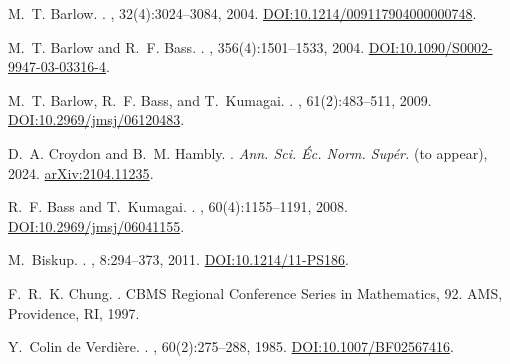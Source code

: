 \documentclass[11pt]{article}
\numberwithin{equation}{section}
\begin{document}

\begin{thebibliography}{99}

M.~T. Barlow.
.
, 32(4):3024--3084, 2004.
\newblock \href{https://doi.org/10.1214/009117904000000748}{DOI:10.1214/009117904000000748}.

M.~T. Barlow and R.~F. Bass.
.
, 356(4):1501--1533, 2004.
\newblock \href{https://doi.org/10.1090/S0002-9947-03-03316-4}{DOI:10.1090/S0002-9947-03-03316-4}.

M.~T. Barlow, R.~F. Bass, and T.~Kumagai.
.
, 61(2):483--511, 2009.
\newblock \href{https://doi.org/10.2969/jmsj/06120483}{DOI:10.2969/jmsj/06120483}.

D.~A. Croydon and B.~M. Hambly.
.
\newblock \emph{Ann. Sci. Éc. Norm. Supér.} (to appear), 2024.
\newblock \href{https://arxiv.org/abs/2104.11235}{arXiv:2104.11235}.

R.~F. Bass and T.~Kumagai.
.
, 60(4):1155--1191, 2008.
\newblock \href{https://doi.org/10.2969/jmsj/06041155}{DOI:10.2969/jmsj/06041155}.

M.~Biskup.
.
, 8:294--373, 2011.
\newblock \href{https://doi.org/10.1214/11-PS186}{DOI:10.1214/11-PS186}.

F.~R.~K. Chung.
.
\newblock CBMS Regional Conference Series in Mathematics, 92. AMS, Providence, RI, 1997.

Y.~Colin de Verdière.
.
, 60(2):275--288, 1985.
\newblock \href{https://doi.org/10.1007/BF02567416}{DOI:10.1007/BF02567416}.


\end{thebibliography}
\end{document}
